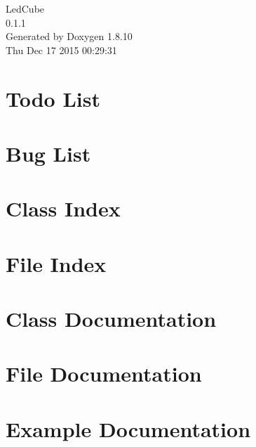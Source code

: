 \documentclass[twoside]{book}
\newcommand{\+}{\discretionary{\mbox{\scriptsize$\hookleftarrow$}}{}{}}
\newcommand{\clearemptydoublepage}{%
  \newpage{\pagestyle{empty}\cleardoublepage}%
}
\begin{document}
\hypersetup{pageanchor=false,
             bookmarks=true,
             bookmarksnumbered=true,
             pdfencoding=unicode
            }
\begin{titlepage}
\vspace*{7cm}
\begin{center}%
{\Large Led\+Cube \\[1ex]\large 0.\+1.\+1 }\\
\vspace*{1cm}
{\large Generated by Doxygen 1.8.10}\\
\vspace*{0.5cm}
{\small Thu Dec 17 2015 00:29:31}\\
\end{center}
\end{titlepage}
\clearemptydoublepage
\tableofcontents
\clearemptydoublepage
{}
\hypersetup{pageanchor=true}

\chapter{Todo List}
\label{todo}
\hypertarget{todo}{}

\chapter{Bug List}
\label{bug}
\hypertarget{bug}{}

\chapter{Class Index}

\chapter{File Index}

\chapter{Class Documentation}



\chapter{File Documentation}






































\chapter{Example Documentation}


\backmatter
\newpage
{}
\clearemptydoublepage
{}
\printindex
\end{document}
